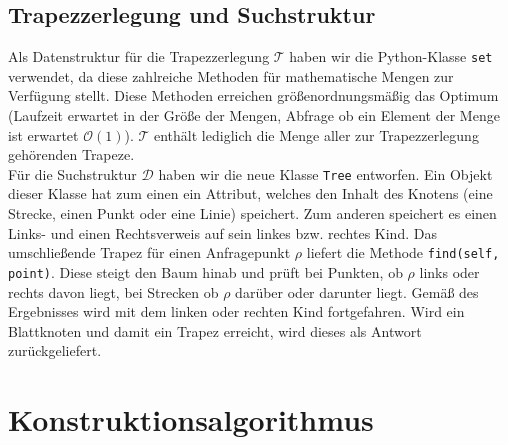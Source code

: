 \documentclass[11pt, a4paper]{article}
\newcommand{\T}{\ensuremath{\mathcal{T}} }
\newcommand{\D}{\ensuremath{\mathcal{D}} }
\begin{document}
\subsection{Trapezzerlegung und Suchstruktur}

Als Datenstruktur für die Trapezzerlegung \T haben wir die Python-Klasse \texttt{set} verwendet, da diese zahlreiche Methoden für mathematische Mengen zur Verfügung stellt. Diese Methoden erreichen größenordnungsmäßig das Optimum (Laufzeit erwartet in der Größe der Mengen, Abfrage ob ein Element der Menge ist erwartet $\mathcal{O}(1)$). \T enthält lediglich die Menge aller zur Trapezzerlegung gehörenden Trapeze.\\
Für die Suchstruktur \D haben wir die neue Klasse \texttt{Tree} entworfen. Ein Objekt dieser Klasse hat zum einen ein Attribut, welches den Inhalt des Knotens (eine Strecke, einen Punkt oder eine Linie) speichert. Zum anderen speichert es einen Links- und einen Rechtsverweis auf sein linkes bzw. rechtes Kind. Das umschließende Trapez für einen Anfragepunkt $\rho$ liefert die Methode \texttt{find(self, point)}. Diese steigt den Baum hinab und prüft bei Punkten, ob $\rho$ links oder rechts davon liegt, bei Strecken ob $\rho$ darüber oder darunter liegt. Gemäß des Ergebnisses wird mit dem linken oder rechten Kind fortgefahren. Wird ein Blattknoten und damit ein Trapez erreicht, wird dieses als Antwort zurückgeliefert.

\section{Konstruktionsalgorithmus}
\end{document}
